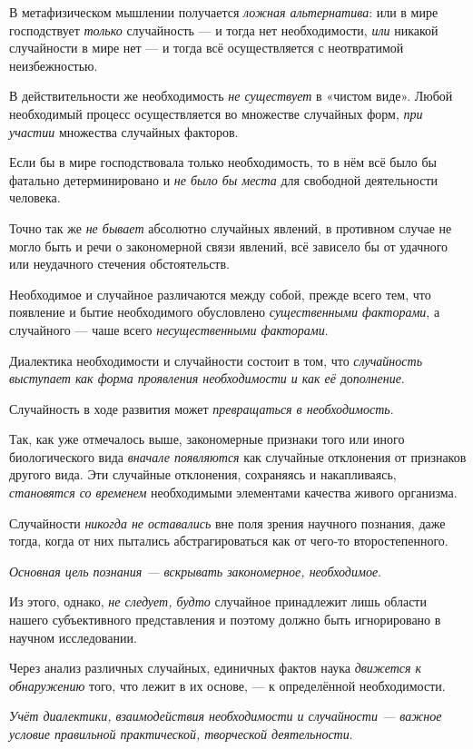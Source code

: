 \documentclass[a4paper,14pt,russian]{extreport}
\begin{document}
В метафизическом мышлении получается \emph{ложная альтернатива}: или в мире господствует \emph{только} случайность --- и тогда нет необходимости, \emph{или} никакой случайности в мире нет --- и тогда всё осуществляется с неотвратимой неизбежностью.

В действительности же необходимость \emph{не существует} в «чистом виде». Любой необходимый процесс осуществляется во множестве случайных форм, \emph{при участии} множества случайных факторов.

Если бы в мире господствовала только необходимость, то в нём всё было бы фатально детерминировано и \emph{не было бы места} для свободной деятельности человека.

Точно так же \emph{не бывает} абсолютно случайных явлений, в противном случае не могло быть и речи о закономерной связи явлений, всё зависело бы от удачного или неудачного стечения обстоятельств.

Необходимое и случайное различаются между собой, прежде всего тем, что появление и бытие необходимого обусловлено \emph{существенными факторами}, а случайного --- чаше всего \emph{несущественными факторами}.

Диалектика необходимости и случайности состоит в том, что \emph{случайность выступает как форма проявления необходимости и как её} до\emph{полнение}.

Случайность в ходе развития может \emph{превращаться в необходимость}.

Так, как уже отмечалось выше, закономерные признаки того или иного биологического вида \emph{вначале появляются} как случайные отклонения от признаков другого вида. Эти случайные отклонения, сохраняясь и накапливаясь, \emph{становятся со временем} необходимыми элементами качества живого организма.

Случайности \emph{никогда не оставались} вне поля зрения научного познания, даже тогда, когда от них пытались абстрагироваться как от чего-то второстепенного.

\emph{Основная цель познания --- вскрывать закономерное, необходимое}.

Из этого, однако, \emph{не следует, будто} случайное принадлежит лишь области нашего субъективного представления и поэтому должно быть игнорировано в научном исследовании.

Через анализ различных случайных, единичных фактов наука \emph{движется к обнаружению} того, что лежит в их основе, --- к определённой необходимости.

\emph{Учёт диалектики, взаимодействия необходимости и случайности --- важное условие правильной практической, творческой деятельности}.
\end{document}
